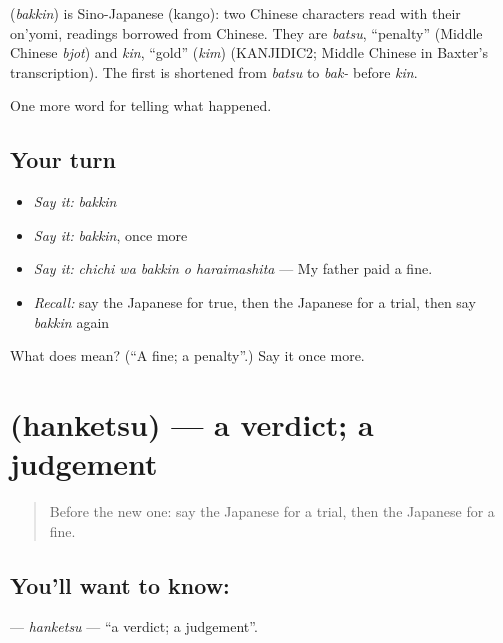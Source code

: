 \begin{cousinweb}
\textbf{} (\emph{bakkin}) is Sino-Japanese (kango): two Chinese characters read with their on'yomi, readings borrowed from Chinese. They are \emph{batsu}, \textquotedblleft{}penalty\textquotedblright{} (Middle Chinese \emph{bjot}) and \emph{kin}, \textquotedblleft{}gold\textquotedblright{} (\emph{kim}) (KANJIDIC2; Middle Chinese in Baxter's transcription). The first is shortened from \emph{batsu} to \emph{bak-} before \emph{kin}.
\end{cousinweb}

\begin{grammarlens}[title={What you've built}]
One more word for telling what happened.
\end{grammarlens}

\subsection*{Your turn}
\begin{itemize}
\raggedright
  \item \emph{Say it:} \emph{bakkin}
  \item \emph{Say it:} \emph{bakkin}, once more
  \item \emph{Say it:} \emph{chichi wa bakkin o haraimashita} — My father paid a fine.
  \item \emph{Recall:} say the Japanese for true, then the Japanese for a trial, then say \emph{bakkin} again
\end{itemize}

\begin{tcolorbox}[breakable,colback=teal!4,colframe=teal!35!black,title={Before you move on}]
What does  mean? (\textquotedblleft{}A fine; a penalty\textquotedblright{}.) Say it once more.
\end{tcolorbox}
\section[\texorpdfstring{\ja{はんけつ} (hanketsu)}{はんけつ (hanketsu)}]{ (hanketsu) — a verdict; a judgement}

\label{lesson:JA-C273-hanketsu}



\begin{quote}
Before the new one: say the Japanese for a trial, then the Japanese for a fine.
\end{quote}

\subsection*{You'll want to know: }
\textbf{} — \emph{hanketsu} — \textquotedblleft{}a verdict; a judgement\textquotedblright{}.

